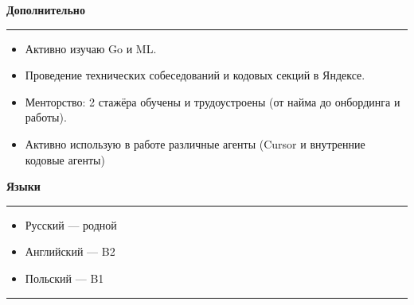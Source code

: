 \documentclass[11pt, a4paper]{article}
\newcommand{\sectionresume}[1]{\vspace{0.6em}\textbf{\large #1}\vspace{0.3em}\hrule\vspace{0.4em}}
\begin{document}
\sectionresume{Дополнительно}

\begin{itemize}[nosep, leftmargin=*]
  \item Активно изучаю Go и ML.
  \item Проведение технических собеседований и кодовых секций в Яндексе.
  \item Менторство: 2 стажёра обучены и трудоустроены (от найма до онбординга и работы).
  \item Активно использую в работе различные агенты (Cursor и внутренние кодовые агенты)
\end{itemize}

\sectionresume{Языки}

\begin{itemize}[nosep, leftmargin=*]
  \item Русский — родной
  \item Английский — B2
  \item Польский — B1
\end{itemize}

\vspace{1.2em}
\hrule
\vspace{0.8em}
\end{document}
